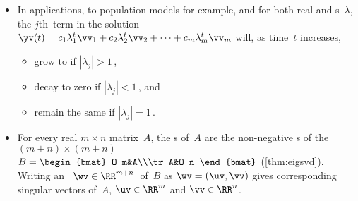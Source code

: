 \begin{itemize}
\itemme Suppose the \(n\times n\) ~\(A\) governs the dynamics of \(\yv(t)\in\RR^n\) according to \(\yv(t+1)=A\yv(t)\) (\cref{thm:dynsol}).
\begin{itemize}
\item Let \hlist\lambda m\ be s of~\(A\) and \hlist\vv m\ be corresponding s, then a solution of \(\yv(t+1)=A\yv(t)\) is the 
\begin{equation*}
\yv(t)=c_1\lambda_1^t\vv_1+c_2\lambda_2^t\vv_2+\cdots+c_m\lambda_m^t\vv_m
\end{equation*}
for all constants \hlist cm.

\sloppy
\item Further, if the number of eigenvectors \(m=n\) (the size of~\(A\)), and the matrix of eigenvectors \(P=\begin{bmatrix} \vv_1&\vv_2&\cdots&\vv_n \end{bmatrix}\) is , then the general  is a , in that unique constants \hlist cn\ may be found for every given ~\(\yv(0)\).
\end{itemize}

\item In applications, to population models for example, and for both real and s~\(\lambda\), the \(j\)th~term in the solution \(\yv(t)=c_1\lambda_1^t\vv_1+c_2\lambda_2^t\vv_2+\cdots+c_m\lambda_m^t\vv_m\) will, as time~\(t\) increases,
\begin{itemize}
\item grow to  if \(|\lambda_j|>1\)\,,
\item decay to zero if \(|\lambda_j|<1\)\,, and
\item remain the same  if \(|\lambda_j|=1\)\,.
\end{itemize}


\item For every real \(m\times n\) matrix~\(A\), the s of~\(A\) are the non-negative s of the \((m+n)\times(m+n)\)  \(B=\begin{bmat} O_m&A\\\tr A&O_n \end{bmat}\) (\cref{thm:eigsvd}). 
Writing an ~\(\wv\in\RR^{m+n}\)\ of~\(B\) as \(\wv=(\uv,\vv)\) gives corresponding singular vectors of~\(A\), \(\uv\in\RR^m\) and \(\vv\in\RR^n\).



\end{itemize}
